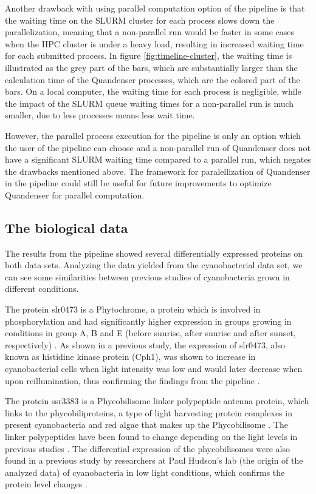 Another drawback with using parallel computation option of the pipeline is that the waiting time on the SLURM cluster for each process slows down the parallelization, meaning that a non-parallel run would be faster in some cases when the HPC cluster is under a heavy load, resulting in increased waiting time for each submitted process. In figure \ref{fig:timeline-cluster}, the waiting time is illustrated as the grey part of the bars, which are substantially larger than the calculation time of the Quandenser processes, which are the colored part of the bars. On a local computer, the waiting time for each process is negligible, while the impact of the SLURM queue waiting times for a non-parallel run is much smaller, due to less processes means less wait time.

However, the parallel process execution for the pipeline is only an option which the user of the pipeline can choose and a non-parallel run of Quandenser does not have a significant SLURM waiting time compared to a parallel run, which negates the drawbacks mentioned above. The framework for paralellization of Quandenser in the pipeline could still be useful for future improvements to optimize Quandenser for parallel computation.

\subsection{The biological data}
The results from the pipeline showed several differentially expressed proteins on both data sets. Analyzing the data yielded from the cyanobacterial data set, we can see some similarities between previous studies of cyanobacteria grown in different conditions.

The protein slr0473 is a Phytochrome, a protein which is involved in phosphorylation and had significantly higher expression in groups growing in conditions in group A, B and E (before sunrise, after sunrise and after sunset, respectively) \cite{phytochrome}. As shown in a previous study, the expression of slr0473, also known as histidine kinase protein (Cph1), was shown to increase in cyanobacterial cells when light intensity was low and would later decrease when upon reillumination, thus confirming the findings from the pipeline \cite{phytochrome-dark}.

The protein ssr3383 is a Phycobilisome linker polypeptide antenna protein, which links to the phycobiliproteins, a type of light harvesting protein complexes in present cyanobacteria and red algae that makes up the Phycobilisome \cite{phycobilisomes}. The linker polypeptides have been found to change depending on the light levels in previous studies \cite{cyano-low-light}. The differential expression of the phycobilisomes were also found in a previous study by researchers at Paul Hudson's lab (the origin of the analyzed data) of cyanobacteria in low light conditions, which confirms the protein level changes \cite{michael-jahn-cyano}.

